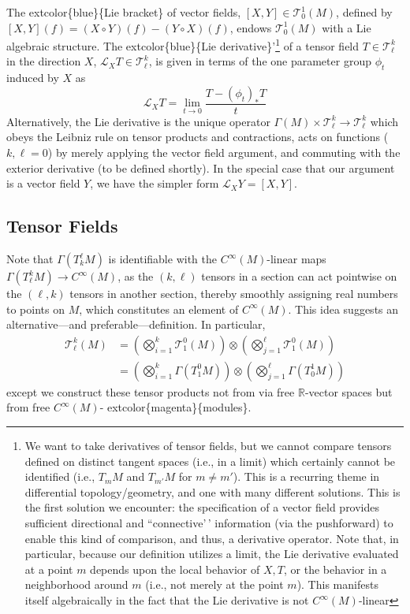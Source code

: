 \documentclass[
]{book}
\begin{document}
The extcolor\{blue\}\{Lie bracket\} of vector fields, \([X,Y] \in \mathcal{T}_0^1(M)\), defined by \([X,Y](f) = (X \circ Y)(f) - (Y \circ X)(f)\), endows \(\mathcal{T}_0^1(M)\) with a Lie algebraic structure.
The extcolor\{blue\}\{Lie derivative\}'\footnote{We want to take derivatives of tensor fields, but we cannot compare tensors defined on distinct tangent spaces (i.e., in a limit) which certainly cannot be identified (i.e., \(T_m M\) and \(T_{m'} M\) for \(m \neq m'\)). This is a recurring theme in differential topology/geometry, and one with many different solutions. This is the first solution we encounter: the specification of a vector field provides sufficient directional and ``connective'\,' information (via the pushforward) to enable this kind of comparison, and thus, a derivative operator. Note that, in particular, because our definition utilizes a limit, the Lie derivative evaluated at a point \(m\) depends upon the local behavior of \(X,T\), or the behavior in a neighborhood around \(m\) (i.e., not merely at the point \(m\)). This manifests itself algebraically in the fact that the Lie derivative is not \(C^\infty(M)\)-linear} of a tensor field \(T \in \mathcal{T}_\ell^k\) in the direction \(X\), \(\mathcal{L}_X T \in \mathcal{T}_\ell^k\), is given in terms of the one parameter group \(\phi_t\) induced by \(X\) as
\begin{equation}     
    \mathcal{L}_X T = \lim_{t \to 0} \frac{T - (\phi_t)_* T}{t} 
\end{equation}
Alternatively, the Lie derivative is the unique operator \(\Gamma(M) \times \mathcal{T}_\ell^k \to \mathcal{T}_\ell^k\) which obeys the Leibniz rule on tensor products and contractions, acts on functions (\(k, \ell = 0\)) by merely applying the vector field argument, and commuting with the exterior derivative (to be defined shortly).
In the special case that our argument is a vector field \(Y\), we have the simpler form \(\mathcal{L}_X Y = [X,Y]\).

\hypertarget{tensor-fields}{%
\subsection{Tensor Fields}\label{tensor-fields}}

Note that \(\Gamma(T_k^\ell M)\) is identifiable with the \(C^\infty(M)\)-linear maps \(\Gamma(T_\ell^k M) \to C^\infty(M)\), as the \((k,\ell)\) tensors in a section can act pointwise on the \((\ell,k)\) tensors in another section, thereby smoothly assigning real numbers to points on \(M\), which constitutes an element of \(C^\infty(M)\).
This idea suggests an alternative---and preferable---definition. In particular,
\begin{align*} 
    \mathcal{T}_\ell^k(M) 
    &= \left(\bigotimes_{i=1}^k \mathcal{T}_1^0(M)\right) \otimes     \left(\bigotimes_{j=1}^\ell \mathcal{T}_1^0(M)\right) \\ 
    &= \left(\bigotimes_{i=1}^k \Gamma(T_1^0 M)\right) \otimes \left(\bigotimes_{j=1}^\ell \Gamma(T_0^1 M)\right) 
\end{align*}
except we construct these tensor products not from via free \(\mathbb{R}\)-vector spaces but from free \(C^\infty(M)\)- extcolor\{magenta\}\{modules\}.
\end{document}
